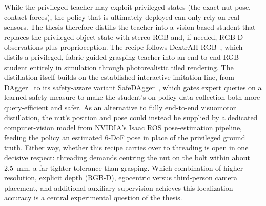 \documentclass[AIRstudentexpose%
              ,optBiber%
              ,optBibstyleNumeric%
              ,optEnglish%
              ]{AIRlatex}%
\begin{document}
{While the privileged teacher may exploit privileged states (the exact nut pose, contact forces), the policy that is ultimately deployed can only rely on real sensors. The thesis therefore distills the teacher into a vision-based student that replaces the privileged object state with stereo RGB and, if needed, RGB-D observations plus proprioception. The recipe follows DextrAH-RGB~\cite{Singh2025}, which distils a privileged, fabric-guided grasping teacher into an end-to-end RGB student entirely in simulation through photorealistic tiled rendering. The distillation itself builds on the established interactive-imitation line, from DAgger~\cite{Ross2011} to its safety-aware variant SafeDAgger~\cite{Zhang2016}, which gates expert queries on a learned safety measure to make the student's on-policy data collection both more query-efficient and safer. As an alternative to fully end-to-end visuomotor distillation, the nut's position and pose could instead be supplied by a dedicated computer-vision model from NVIDIA's Isaac ROS pose-estimation pipeline, feeding the policy an estimated 6-DoF pose in place of the privileged ground truth. Either way, whether this recipe carries over to threading is open in one decisive respect: threading demands centring the nut on the bolt within about 2.5~mm, a far tighter tolerance than grasping. Which combination of higher resolution, explicit depth (RGB-D), egocentric versus third-person camera placement, and additional auxiliary supervision achieves this localization accuracy is a central experimental question of the thesis.%
}%
%
%
\section{}%
%
\end{document}
